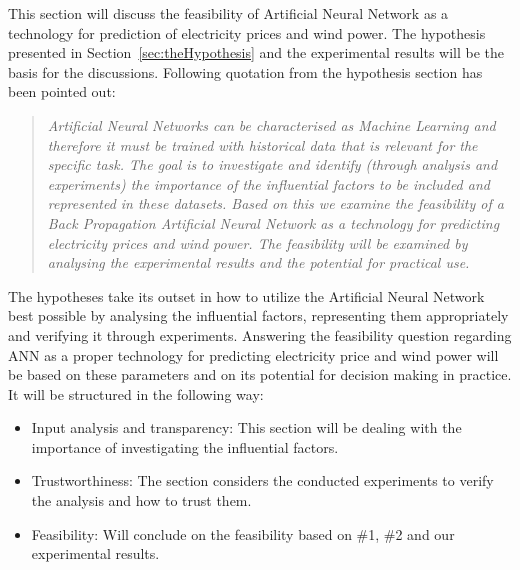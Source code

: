 This section will discuss the feasibility of Artificial Neural Network as a technology for prediction of electricity prices and wind power. The hypothesis presented in Section~\ref{sec:theHypothesis} and the experimental results will be the basis for the discussions. Following quotation from the hypothesis section has been pointed out:

\begin{quotation}
\textit{Artificial Neural Networks can be characterised as Machine Learning\cite{18} and therefore it must be trained with historical data that is relevant for the specific task. The goal is to investigate and identify (through analysis and experiments) the importance of the influential factors to be included and represented in these datasets. Based on this we examine the feasibility of a Back Propagation Artificial Neural Network as a technology for predicting electricity prices and wind power. The feasibility will be examined by analysing the experimental results and the potential for practical use.}
\end{quotation}

\noindent The hypotheses take its outset in how to utilize the Artificial Neural Network best possible by analysing the influential factors, representing them appropriately and verifying it through experiments. Answering the feasibility question regarding ANN as a proper technology for predicting electricity price and wind power will be based on these parameters and on its potential for decision making in practice. It will be structured in the following way:

\begin{itemize}
\item Input analysis and transparency: This section will be dealing with the importance of investigating the influential factors.
\item Trustworthiness: The section considers the conducted experiments to verify the analysis and how to trust them.
\item Feasibility: Will conclude on the feasibility based on \#1, \#2 and our experimental results.
\end{itemize}

